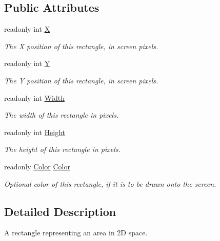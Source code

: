 \subsection*{Public Attributes}
\begin{DoxyCompactItemize}
\item 
readonly int \hyperlink{struct_tri_devs_1_1_tri_engine2_d_1_1_rectangle_af18eb626ddefe409db12bc6f88dc56ac}{X}
\begin{DoxyCompactList}\small\item\em The X position of this rectangle, in screen pixels. \end{DoxyCompactList}\item 
readonly int \hyperlink{struct_tri_devs_1_1_tri_engine2_d_1_1_rectangle_a52773c5bc13a3e4b9a494879d2c0692f}{Y}
\begin{DoxyCompactList}\small\item\em The Y position of this rectangle, in screen pixels. \end{DoxyCompactList}\item 
readonly int \hyperlink{struct_tri_devs_1_1_tri_engine2_d_1_1_rectangle_a0e6a4faf2c4ba9c9284d7715ae9a555c}{Width}
\begin{DoxyCompactList}\small\item\em The width of this rectangle in pixels. \end{DoxyCompactList}\item 
readonly int \hyperlink{struct_tri_devs_1_1_tri_engine2_d_1_1_rectangle_a955ba67d04f81e6f30a983cd579d4509}{Height}
\begin{DoxyCompactList}\small\item\em The height of this rectangle in pixels. \end{DoxyCompactList}\item 
readonly \hyperlink{struct_tri_devs_1_1_tri_engine2_d_1_1_color}{Color} \hyperlink{struct_tri_devs_1_1_tri_engine2_d_1_1_rectangle_a1638cf0774ee3ac981f8d517a857f720}{Color}
\begin{DoxyCompactList}\small\item\em Optional color of this rectangle, if it is to be drawn onto the screen. \end{DoxyCompactList}\end{DoxyCompactItemize}


\subsection{Detailed Description}
A rectangle representing an area in 2\-D space. 



